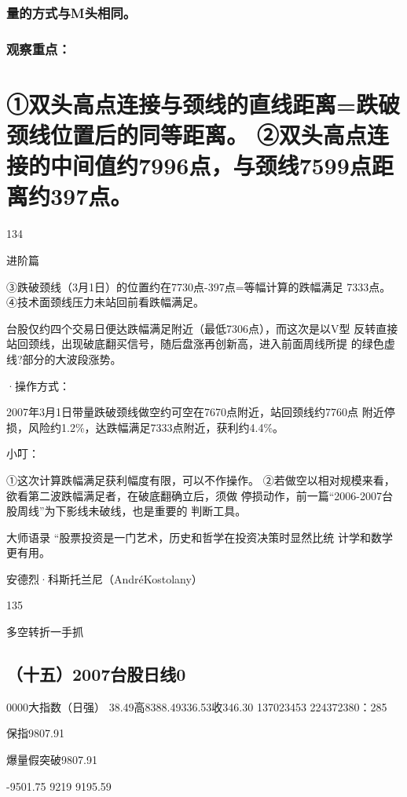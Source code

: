 \documentclass{article}
\begin{document}
\subsubsection{量的方式与M头相同。}

\subsubsection{观察重点：}

\section{①双头高点连接与颈线的直线距离=跌破颈线位置后的同等距离。 ②双头高点连接的中间值约7996点，与颈线7599点距离约397点。}

134

\clearpage

进阶篇

③跌破颈线（3月1日）的位置约在7730点-397点=等幅计算的跌幅满足 7333点。 ④技术面颈线压力未站回前看跌幅满足。

台股仅约四个交易日便达跌幅满足附近（最低7306点），而这次是以V型 反转直接站回颈线，出现破底翻买信号，随后盘涨再创新高，进入前面周线所提 的绿色虚线?部分的大波段涨势。

·操作方式：

2007年3月1日带量跌破颈线做空约可空在7670点附近，站回颈线约7760点 附近停损，风险约1.2\%，达跌幅满足7333点附近，获利约4.4\%。

小叮：

①这次计算跌幅满足获利幅度有限，可以不作操作。 ②若做空以相对规模来看，欲看第二波跌幅满足者，在破底翻确立后，须做 停损动作，前一篇“2006-2007台股周线”为下影线未破线，也是重要的 判断工具。

大师语录 “股票投资是一门艺术，历史和哲学在投资决策时显然比统 计学和数学更有用。

安德烈·科斯托兰尼（AndréKostolany）

135

\clearpage

多空转折一手抓

\subsection{（十五）2007台股日线0}

0000大指数（日强） 38.49高8388.49336.53收346.30 137023453 224372380：285

保指9807.91

爆量假突破9807.91

-9501.75 9219 9195.59
\end{document}
